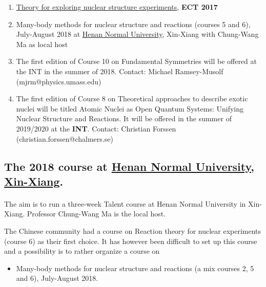 \documentclass[%
oneside,                 %
final,                   %
10pt]{article}
\begin{document}
\begin{enumerate}
\item \href{{https://github.com/NuclearTalent/NuclearStructure}}{Theory for exploring nuclear structure experiments}, \textbf{ECT 2017}

\item Many-body methods for nuclear structure and reactions (courses 5 and 6), July-August 2018 at \href{{http://www.htu.cn/english/}}{Henan Normal University}, Xin-Xiang with Chung-Wang Ma as local host

\item The first edition of Course 10 on Fundamental Symmetries will be offered at the INT in the summer of 2018. Contact: Michael Ramsey-Musolf (mjrm@physics.umass.edu)

\item The first edition of Course 8 on Theoretical approaches to describe exotic nuclei will be titled Atomic Nuclei as Open Quantum Systems: Unifying Nuclear Structure and Reactions. It will be offered in the summer of 2019/2020 at the \textbf{INT}. Contact: Christian Forssen (christian.forssen@chalmers.se)
\end{enumerate}

\noindent





\subsection{The 2018 course at \href{{http://www.htu.cn/english/}}{Henan Normal University, Xin-Xiang}.}

\paragraph{}
The aim is to run a three-week Talent course at Henan Normal University in Xin-Xiang. Professor Chung-Wang Ma is the local host. 

The Chinese community had a course on Reaction theory for nuclear experiments (course 6) as their first choice. It has however been difficult to set up this course and a possibility is to rather organize a course on

\begin{itemize}
\item Many-body methods for nuclear structure and reactions (a mix courses 2, 5 and 6), July-August 2018.
\end{itemize}
\end{document}
